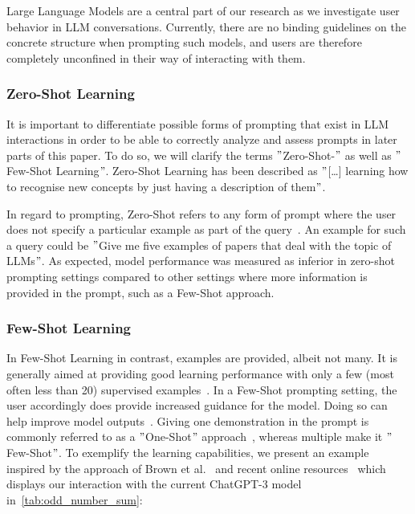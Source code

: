 Large Language Models are a central part of our research as we investigate user behavior in LLM
conversations.
Currently, there are no binding guidelines on the concrete structure when prompting such models,
and users are therefore completely unconfined in their way of interacting with them.

\subsubsection{Zero-Shot Learning} %
It is important to differentiate possible forms of prompting that exist in LLM interactions in order
to be able to correctly analyze and assess prompts in later parts of this paper.
To do so, we will clarify the terms \("\)Zero-Shot-\("\) as well as \("\)Few-Shot Learning\("\).
Zero-Shot Learning has been described as \("\)[\ldots] learning how to recognise
new concepts by just having a description of them\("\)\cite[p. 1]{feris_embarrassingly_2015}.

In regard to prompting, Zero-Shot refers to any form of prompt where the user does not specify
a particular example as part of the query~\cite[p. 1]{dang_how_2022}.
An example for such a query could be \("\)Give me five examples of papers that deal with the topic
of LLMs\("\).
As expected, model performance was measured as inferior in zero-shot prompting settings compared
to other settings where more information is provided in the prompt, such as a Few-Shot approach.


\subsubsection{Few-Shot Learning}
In Few-Shot Learning in contrast, examples are provided, albeit not many.
It is generally aimed at providing good learning performance with only a few (most often less than 20)
supervised examples~\cite[p. 1]{samuel_offline_2022}. %
In a Few-Shot prompting setting, the user accordingly does provide increased guidance for the model.
Doing so can help improve model outputs~\cite[p. 1]{dang_how_2022}.
Giving one demonstration in the prompt is commonly referred to as a \("\)One-Shot\("\) approach~\cite[p. 6]{brown_language_2020},
whereas multiple make it \("\)Few-Shot\("\).
To exemplify the learning capabilities, we present an example inspired by the approach of Brown et al\(.\)~\cite{brown_language_2020}
and recent online resources~\cite{dairai_few-shot_2023} which displays our interaction with
the current ChatGPT-3 model in~\ref{tab:odd_number_sum}:


